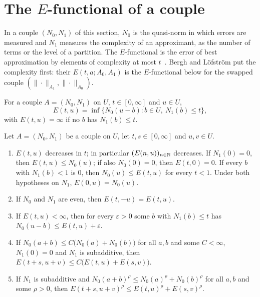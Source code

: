 \section{The \texorpdfstring{$E$}{E}-functional of a couple}
\label{sec:e-functional}

In a couple $(N_0, N_1)$ of this section, $N_0$ is the quasi-norm in which errors are measured
and $N_1$ measures the complexity of an approximant, as the number of terms or the level of a
partition. The $E$-functional is the error of best approximation by elements of complexity at
most $t$~\cite[Section~7.1]{BerghLofstrom}. Bergh and L\"ofstr\"om put the complexity first:
their $E(t, a; A_0, A_1)$ is the $E$-functional below for the swapped couple
$(\|\cdot\|_{A_1}, \|\cdot\|_{A_0})$.

\begin{definition}[$E$-functional]
\label{def:e-functional}
\leanok
{}
For a couple $A = (N_0, N_1)$ on $U$, $t \in [0, \infty]$ and $u \in U$,
\[
  E(t, u) = \inf \{ N_0(u - b) : b \in U, \ N_1(b) \leq t \} ,
\]
with $E(t, u) = \infty$ if no $b$ has $N_1(b) \leq t$.
\end{definition}

\begin{lemma}
\label{lem:e-functional}
\leanok
{}
Let $A = (N_0, N_1)$ be a couple on $U$, let $t, s \in [0, \infty]$ and $u, v \in U$.
\begin{enumerate}
  \item $E(t, u)$ decreases in $t$; in particular $(E(n, u))_{n \in \mathbb{N}}$ decreases. If
    $N_1(0) = 0$, then $E(t, u) \leq N_0(u)$; if also $N_0(0) = 0$, then $E(t, 0) = 0$. If every
    $b$ with $N_1(b) < 1$ is $0$, then $N_0(u) \leq E(t, u)$ for every $t < 1$. Under both
    hypotheses on $N_1$, $E(0, u) = N_0(u)$.
  \item If $N_0$ and $N_1$ are even, then $E(t, -u) = E(t, u)$.
  \item If $E(t, u) < \infty$, then for every $\varepsilon > 0$ some $b$ with $N_1(b) \leq t$ has
    $N_0(u - b) \leq E(t, u) + \varepsilon$.
  \item If $N_0(a + b) \leq C \bigl(N_0(a) + N_0(b)\bigr)$ for all $a, b$ and some $C < \infty$,
    $N_1(0) = 0$ and $N_1$ is subadditive, then
    $E(t + s, u + v) \leq C \bigl(E(t, u) + E(s, v)\bigr)$.
  \item If $N_1$ is subadditive and $N_0(a + b)^\rho \leq N_0(a)^\rho + N_0(b)^\rho$ for all
    $a, b$ and some $\rho > 0$, then $E(t + s, u + v)^\rho \leq E(t, u)^\rho + E(s, v)^\rho$.
\end{enumerate}
\end{lemma}

